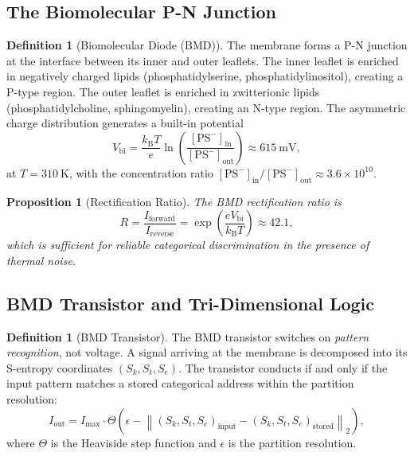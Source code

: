 \documentclass[11pt,twocolumn,a4paper]{article}
\newtheorem{proposition}[theorem]{Proposition}
\theoremstyle{definition}
\newtheorem{definition}[theorem]{Definition}
\theoremstyle{remark}
\newcommand{\Sk}{S_{k}}
\newcommand{\St}{S_{t}}
\newcommand{\Se}{S_{e}}
\newcommand{\kB}{k_{\mathrm{B}}}
\begin{document}
\subsection{The Biomolecular P-N Junction}

\begin{definition}[Biomolecular Diode (BMD)]\label{def:BMD}
The membrane forms a P-N junction at the interface between its inner and outer leaflets.  The inner leaflet is enriched in negatively charged lipids (phosphatidylserine, phosphatidylinositol), creating a P-type region.  The outer leaflet is enriched in zwitterionic lipids (phosphatidylcholine, sphingomyelin), creating an N-type region.  The asymmetric charge distribution generates a built-in potential
\begin{equation}\label{eq:Vbi}
    V_{\mathrm{bi}} = \frac{\kB T}{e} \ln\left(\frac{[\mathrm{PS}^-]_{\mathrm{in}}}{[\mathrm{PS}^-]_{\mathrm{out}}}\right) \approx 615~\mathrm{mV},
\end{equation}
at $T = 310~\mathrm{K}$, with the concentration ratio $[\mathrm{PS}^-]_{\mathrm{in}} / [\mathrm{PS}^-]_{\mathrm{out}} \approx 3.6 \times 10^{10}$.
\end{definition}

\begin{proposition}[Rectification Ratio]\label{prop:rectification}
The BMD rectification ratio is
\begin{equation}\label{eq:rectification}
    R = \frac{I_{\mathrm{forward}}}{I_{\mathrm{reverse}}} = \exp\left(\frac{eV_{\mathrm{bi}}}{\kB T}\right) \approx 42.1,
\end{equation}
which is sufficient for reliable categorical discrimination in the presence of thermal noise.
\end{proposition}

\subsection{BMD Transistor and Tri-Dimensional Logic}

\begin{definition}[BMD Transistor]\label{def:BMD-transistor}
The BMD transistor switches on \emph{pattern recognition}, not voltage.  A signal arriving at the membrane is decomposed into its S-entropy coordinates $(\Sk, \St, \Se)$.  The transistor conducts if and only if the input pattern matches a stored categorical address within the partition resolution:
\begin{equation}\label{eq:BMD-switch}
    I_{\mathrm{out}} = I_{\mathrm{max}} \cdot \Theta\!\left(\epsilon - \left\|(\Sk, \St, \Se)_{\mathrm{input}} - (\Sk, \St, \Se)_{\mathrm{stored}}\right\|_2\right),
\end{equation}
where $\Theta$ is the Heaviside step function and $\epsilon$ is the partition resolution.
\end{definition}
\end{document}
